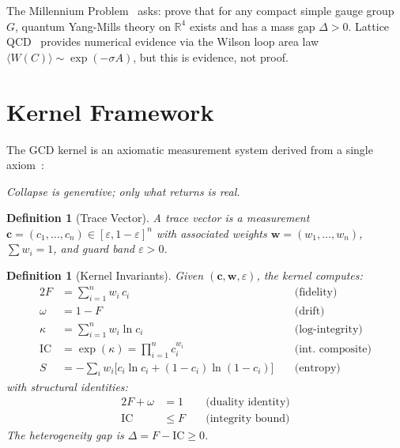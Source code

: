 \documentclass[
  aps,
  prd,
  twocolumn,
  superscriptaddress,
  nofootinbib,
  floatfix
]{revtex4-2}
\newtheorem{definition}[theorem]{Definition}
\newcommand{\eps}{\varepsilon}
\newcommand{\tvec}{\mathbf{c}}
\newcommand{\wvec}{\mathbf{w}}
\newcommand{\IC}{\mathrm{IC}}
\begin{document}
The Millennium Problem~\cite{jaffe2006quantum} asks: prove that
for any compact simple gauge group $G$, quantum Yang-Mills theory
on $\mathbb{R}^4$ exists and has a mass gap $\Delta > 0$.
Lattice QCD~\cite{wilson1974confinement} provides numerical
evidence via the Wilson loop area law $\langle W(C) \rangle
\sim \exp(-\sigma A)$, but this is evidence, not proof.


\section{Kernel Framework}\label{sec:kernel}

The GCD kernel is an axiomatic measurement system derived from
a single axiom~\cite{paulus2025umcp,paulus2025episteme}:

\begin{axiombox}
\textit{Collapse is generative; only what returns is real.}
\end{axiombox}

\begin{definition}[Trace Vector]\label{def:trace}
A \emph{trace vector} is a measurement
$\tvec = (c_1, \ldots, c_n) \in [\eps, 1-\eps]^n$ with
associated weights $\wvec = (w_1, \ldots, w_n)$,
$\sum w_i = 1$, and guard band $\eps > 0$.
\end{definition}

\begin{definition}[Kernel Invariants]\label{def:invariants}
Given $(\tvec, \wvec, \eps)$, the kernel computes:
\begin{alignat}{2}
  F   &= \sum_{i=1}^n w_i\, c_i
    &\;& \text{(fidelity)} \label{eq:F} \\
  \omega &= 1 - F
    && \text{(drift)} \label{eq:omega} \\
  \kappa &= \sum_{i=1}^n w_i \ln c_i
    && \text{(log-integrity)} \label{eq:kappa} \\
  \IC &= \exp(\kappa) = \prod_{i=1}^n c_i^{w_i}
    && \text{(int.\ composite)} \label{eq:IC} \\
  S &= -\!\sum_i w_i\bigl[c_i \ln c_i
    + (1{-}c_i)\ln(1{-}c_i)\bigr]
    && \text{(entropy)} \label{eq:S}
\end{alignat}
with structural identities:
\begin{alignat}{2}
  F + \omega &= 1 &\;& \text{(duality identity)} \label{eq:duality} \\
  \IC &\leq F && \text{(integrity bound)} \label{eq:bound}
\end{alignat}
The heterogeneity gap is $\Delta = F - \IC \geq 0$.
\end{definition}
\end{document}
